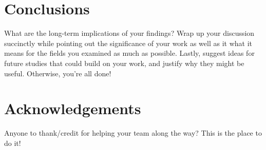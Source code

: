 \section*{Conclusions}
What are the long-term implications of your findings? Wrap up your discussion succinctly while pointing out the significance of your work as well as it what it means for the fields you examined as much as possible. Lastly, suggest ideas for future studies that could build on your work, and justify why they might be useful. Otherwise, you're all done!

\section*{Acknowledgements}
Anyone to thank/credit for helping your team along the way? This is the place to do it!